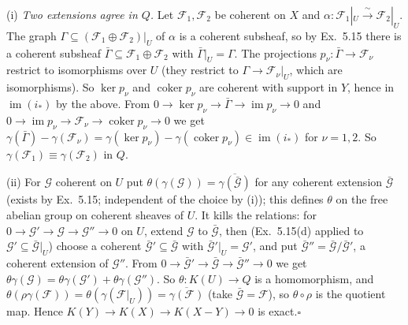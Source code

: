 \documentclass[11pt]{article}
\begin{document}
(i) \emph{Two extensions agree in $Q$.} Let $\mathcal F_1,\mathcal F_2$ be coherent on $X$ and $\alpha:\mathcal F_1|_U\xrightarrow{\ \sim\ }\mathcal F_2|_U$. The graph $\Gamma\subseteq(\mathcal F_1\oplus\mathcal F_2)|_U$ of $\alpha$ is a coherent subsheaf, so by Ex.~5.15 there is a coherent subsheaf $\bar\Gamma\subseteq\mathcal F_1\oplus\mathcal F_2$ with $\bar\Gamma|_U=\Gamma$. The projections $p_\nu:\bar\Gamma\to\mathcal F_\nu$ restrict to isomorphisms over $U$ (they restrict to $\Gamma\to\mathcal F_\nu|_U$, which are isomorphisms). So $\ker p_\nu$ and $\operatorname{coker}p_\nu$ are coherent with support in $Y$, hence in $\operatorname{im}(i_*)$ by the above. From $0\to\ker p_\nu\to\bar\Gamma\to\operatorname{im}p_\nu\to0$ and $0\to\operatorname{im}p_\nu\to\mathcal F_\nu\to\operatorname{coker}p_\nu\to0$ we get $\gamma(\bar\Gamma)-\gamma(\mathcal F_\nu)=\gamma(\ker p_\nu)-\gamma(\operatorname{coker}p_\nu)\in\operatorname{im}(i_*)$ for $\nu=1,2$. So $\gamma(\mathcal F_1)\equiv\gamma(\mathcal F_2)$ in $Q$.

(ii) For $\mathcal G$ coherent on $U$ put $\theta(\gamma(\mathcal G))=\overline{\gamma(\bar{\mathcal G})}$ for any coherent extension $\bar{\mathcal G}$ (exists by Ex.~5.15; independent of the choice by (i)); this defines $\theta$ on the free abelian group on coherent sheaves of $U$. It kills the relations: for $0\to\mathcal G'\to\mathcal G\to\mathcal G''\to0$ on $U$, extend $\mathcal G$ to $\bar{\mathcal G}$, then (Ex.~5.15(d) applied to $\mathcal G'\subseteq\bar{\mathcal G}|_U$) choose a coherent $\bar{\mathcal G}'\subseteq\bar{\mathcal G}$ with $\bar{\mathcal G}'|_U=\mathcal G'$, and put $\bar{\mathcal G}''=\bar{\mathcal G}/\bar{\mathcal G}'$, a coherent extension of $\mathcal G''$. From $0\to\bar{\mathcal G}'\to\bar{\mathcal G}\to\bar{\mathcal G}''\to0$ we get $\theta\gamma(\mathcal G)=\theta\gamma(\mathcal G')+\theta\gamma(\mathcal G'')$. So $\theta:K(U)\to Q$ is a homomorphism, and $\theta(\rho\gamma(\mathcal F))=\theta(\gamma(\mathcal F|_U))=\overline{\gamma(\mathcal F)}$ (take $\bar{\mathcal G}=\mathcal F$), so $\theta\circ\rho$ is the quotient map. Hence $K(Y)\to K(X)\to K(X-Y)\to0$ is exact.\hfill$\square$
\end{document}
